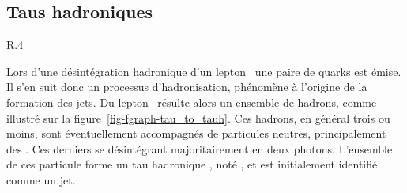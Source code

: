 \subsection{Taus hadroniques}\label{chapter-CMS-section-taus}

\begin{wrapfigure}{R}{.4\textwidth}
\centering

\vspace{\baselineskip}
\caption{Diagramme de Feynman de désintégration hadronique d'un \leptau.}
\label{fig-fgraph-tau_to_tauh}
\end{wrapfigure}
Lors d'une désintégration hadronique d'un lepton \tau\, une paire de quarks est émise.
Il s'en suit donc un processus d'hadronisation, phénomène à l'origine de la formation des jets.
Du lepton \tau\ résulte alors un ensemble de hadrons, comme illustré sur la figure~\ref{fig-fgraph-tau_to_tauh}.
Ces hadrons, en général trois ou moins, sont éventuellement accompagnés de particules neutres, principalement des \pionnull.
Ces derniers se désintégrant majoritairement en deux photons.
L'ensemble de ces particule forme un \og tau hadronique \fg, noté \tauh, et est initialement identifié comme un jet.
